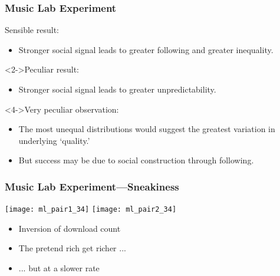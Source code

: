 \begin{frame}
  \frametitle{Music Lab Experiment}

  \begin{block}{Sensible result:}
  \begin{itemize}
  \item<1-> Stronger social signal leads to \alert{greater following and greater inequality}.
  \end{itemize}
  \end{block}

  \begin{block}<2->{Peculiar result:}
  \begin{itemize}
  \item<3-> Stronger social signal leads to greater \alert{unpredictability}.
  \end{itemize}
  \end{block}

  \begin{block}<4->{Very peculiar observation:}
  \begin{itemize}
  \item<5-> The most unequal distributions would suggest the greatest
    variation in underlying `quality.'
  \item<6-> But success may be due to social construction through \alert{following}.
  \end{itemize}
  \end{block}


\end{frame}


\begin{frame}
  \frametitle{Music Lab Experiment---Sneakiness}

  \texttt{[image: ml\_pair1\_34]}
  \texttt{[image: ml\_pair2\_34]}

  \begin{itemize}
  \item <1-> Inversion of download count
  \item <2-> The pretend rich get richer ...
  \item <3-> ... but at a slower rate
  \end{itemize}

\end{frame}

